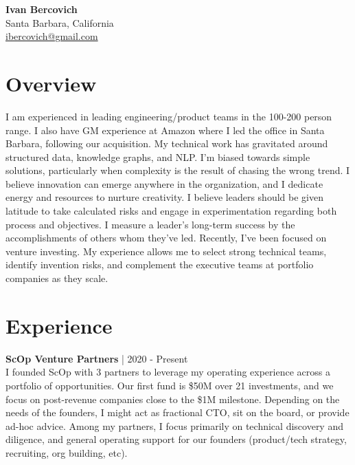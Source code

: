 \documentclass[a4paper,10pt]{article}
\begin{document}
\noindent
\textbf{\Large Ivan Bercovich} \\
Santa Barbara, California \\
\href{mailto:ibercovich@gmail.com}{ibercovich@gmail.com} \\
\vspace{0.3cm}

\section*{Overview}
\noindent
I am experienced in leading engineering/product teams in the 100-200 person range. I also have GM experience at Amazon where I led the office in Santa Barbara, following our acquisition. My technical work has gravitated around structured data, knowledge graphs, and NLP. I’m biased towards simple solutions, particularly when complexity is the result of chasing the wrong trend. I believe innovation can emerge anywhere in the organization, and I dedicate energy and resources to nurture creativity. I believe leaders should be given latitude to take calculated risks and engage in experimentation regarding both process and objectives. I measure a leader’s long-term success by the accomplishments of others whom they’ve led. Recently, I’ve been focused on venture investing. My experience allows me to select strong technical teams, identify invention risks, and complement the executive teams at portfolio companies as they scale.

\section*{Experience}

\noindent
\textbf{ScOp Venture Partners} | 2020 - Present \\
I founded ScOp with 3 partners to leverage my operating experience across a portfolio of opportunities. Our first fund is \$50M over 21 investments, and we focus on post-revenue companies close to the \$1M milestone. Depending on the needs of the founders, I might act as fractional CTO, sit on the board, or provide ad-hoc advice. Among my partners, I focus primarily on technical discovery and diligence, and general operating support for our founders (product/tech strategy, recruiting, org building, etc).

\vspace{5pt} %
\end{document}
